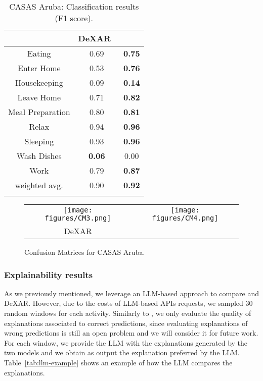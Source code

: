 \begin{table}
\begin{center}
\begin{tabular}{ccc}
\hline
& DeXAR~\cite{arrotta2022dexar} & \acronym{} \\
\hline
Eating & 0.69 & \textbf{0.75} \\
Enter Home & 0.53 & \textbf{0.76} \\
Housekeeping & 0.09 & \textbf{0.14} \\
Leave Home & 0.71 & \textbf{0.82} \\
Meal Preparation & 0.80 & \textbf{0.81} \\
Relax & 0.94 & \textbf{0.96} \\
Sleeping & 0.93 & \textbf{0.96} \\
Wash Dishes & \textbf{0.06} & 0.00 \\
Work & 0.79 & \textbf{0.87} \\
\hline
weighted avg. & 0.90 & \textbf{0.92}\\
\hline
\hspace{5pt}
\end{tabular}
\caption{CASAS Aruba: Classification results (F1 score).}
\label{tab:clf_aruba}
\end{center}
\end{table}


\begin{figure*}
  \centering
  \begin{tabular}{c @{\qquad} c }
    \texttt{[image: figures/CM3.png]} &
    \texttt{[image: figures/CM4.png]} \\
    \small DeXAR & \small \acronym{}
  \end{tabular}
  \caption[Classification results on CASAS Aruba]{Confusion Matrices for CASAS Aruba.}
  \label{fig:cm_aruba}
\end{figure*}


\subsubsection{Explainability results}

As we previously mentioned, we leverage an LLM-based approach to compare \acronym{} and DeXAR. However, due to the costs of LLM-based APIs requests, we sampled $30$ random windows for each activity. Similarly to \cite{arrotta2022dexar}, we only evaluate the quality of explanations associated to correct predictions, since evaluating explanations of wrong predictions is still an open problem and we will consider it for future work.
For each window, we provide the LLM with the explanations generated by the two models and we obtain as output the explanation preferred by the LLM.
Table~\ref{tab:llm-example} shows an example of how the LLM compares the explanations.

